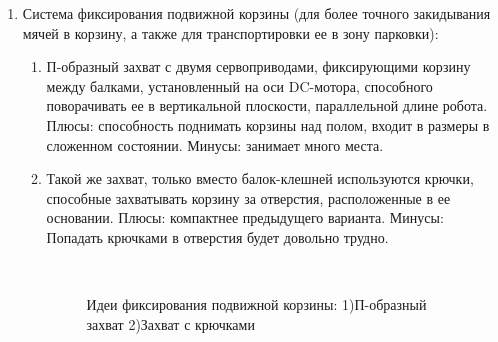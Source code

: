 \begin{enumerate}
\begin{enumerate}
\begin{enumerate}
\begin{enumerate}
	    \end{enumerate}
	    
	    \item Система фиксирования подвижной корзины (для более точного закидывания мячей в корзину, а также для транспортировки ее в зону парковки):
	    \begin{enumerate}
	      \item П-образный захват с двумя сервоприводами, фиксирующими корзину между балками, установленный на оси DC-мотора, способного поворачивать ее в вертикальной плоскости, параллельной длине робота. Плюсы: способность поднимать корзины над полом, входит в размеры в сложенном состоянии. Минусы: занимает много места.
	      
          \item Такой же захват, только вместо балок-клешней используются крючки, способные захватывать корзину за отверстия, расположенные в ее основании. Плюсы: компактнее предыдущего варианта. Минусы: Попадать крючками в отверстия будет довольно трудно.
          
			\begin{figure}[H]
				\begin{minipage}[h]{0.2\linewidth}
					\center  
				\end{minipage}
				\begin{minipage}[h]{0.6\linewidth}
          		\caption{Идеи фиксирования подвижной корзины: 1)П-образный захват 2)Захват с крючками}
				\end{minipage}
			\end{figure}
          
        \end{enumerate}
      \end{enumerate}
    \end{enumerate}
    

\end{enumerate}
